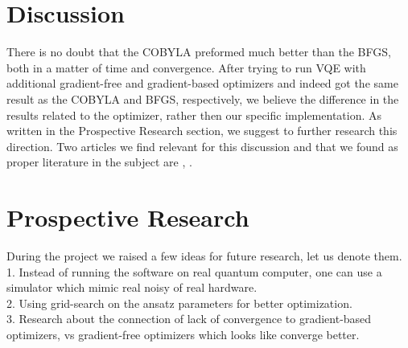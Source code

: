 \documentclass[12pt, a4paper]{article}
\begin{document}
    \section{Discussion}
    There is no doubt that the COBYLA preformed much better than the BFGS, both in a matter of time and convergence. After trying to run VQE with additional gradient-free and gradient-based optimizers and indeed got the same result as the COBYLA and BFGS, respectively, we believe the difference in the results related to the optimizer, rather then our specific implementation. As written in the Prospective Research section, we suggest to further research this direction.
    Two articles we find relevant for this discussion and that we found as proper literature in the subject are \cite{pellow2021comparison}, \cite{wierichs2020avoiding}.


    \section{Prospective Research}
    During the project we raised a few ideas for future research, let us denote them.\\
    1. Instead of running the software on real quantum computer, one can use a simulator which mimic real noisy of real hardware.\\
    2. Using grid-search on the ansatz parameters for better optimization.\\
    3. Research about the connection of lack of convergence to gradient-based optimizers, vs gradient-free optimizers which looks like converge better.

    
    
\end{document}
